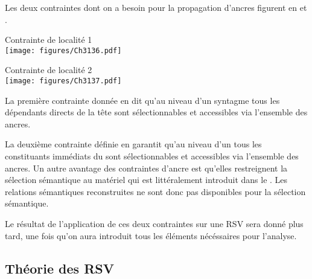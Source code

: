 Les deux contraintes dont on a besoin pour la propagation d’ancres figurent en  et . 

\ea \label{ch3:ex136}
Contrainte de localité 1\\
\texttt{[image: figures/Ch3136.pdf]}


\z


\ea \label{ch3:ex137}
Contrainte de localité 2\\
\texttt{[image: figures/Ch3137.pdf]}


\z

La première contrainte donnée en  dit qu’au niveau d’un syntagme tous les dépendants directs de la tête sont sélectionnables et accessibles via l’ensemble des ancres.

La deuxième contrainte définie en  garantit qu’au niveau d’un  tous les constituants immédiats du  sont sélectionnables et accessibles via l’ensemble des ancres. Un autre avantage des contraintes d’ancre est qu’elles restreignent la sélection sémantique au matériel qui est littéralement introduit dans le . Les relations sémantiques reconstruites ne sont donc pas disponibles pour la sélection sémantique.

Le résultat de l’application de ces deux contraintes sur une RSV sera donné plus tard, une fois qu’on aura introduit tous les éléments nécéssaires pour l’analyse.


\subsection{Théorie des RSV}\label{ch3:sect3.5.5}

